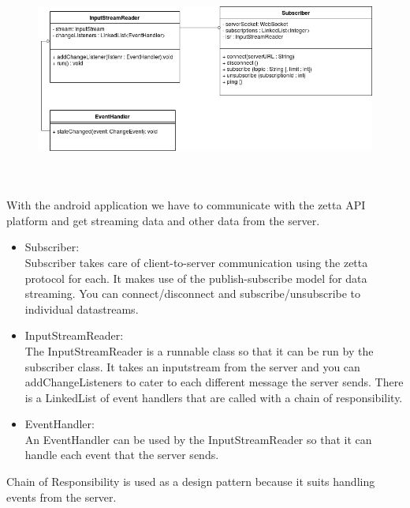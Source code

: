 \begin{center}
\begin{figure}[h]
	\includegraphics[width=15cm, height=7cm]{DataPull/DataPull.png}
\end{figure}
\end{center}
With the android application we have to communicate with the zetta API platform and get streaming data and other data from the server.
\begin{itemize}
	\item Subscriber:\\
	Subscriber takes care of client-to-server communication using the zetta protocol for each. It makes use of the publish-subscribe model for data streaming. You can connect/disconnect and subscribe/unsubscribe to individual datastreams.

	\item InputStreamReader:\\
	The InputStreamReader is a runnable class so that it can be run by the subscriber class. It takes an inputstream from the server and you can addChangeListeners to cater to each different message the server sends. There is a LinkedList of event handlers that are called with a chain of responsibility.

	\item EventHandler:\\
	An EventHandler can be used by the InputStreamReader so that it can handle each event that the server sends.

\end{itemize}
Chain of Responsibility is used as a design pattern because it suits handling events from the server.
